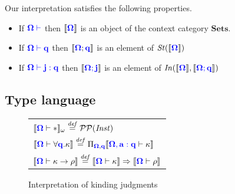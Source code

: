 \documentclass[sigplan,10pt,review,anonymous]{acmart}
\newcommand{\blum}[1]{\mathbf{\color{blue}{#1}}}
\newcommand{\defeq}{\overset{\mathit{def}}{=}}
\newcommand{\sem}[1]{\llbracket #1 \rrbracket}
\begin{document}
\begin{theorem} Our interpretation satisfies the following properties.
\begin{itemize}
\item If $\blum{\Omega \vdash}$ then $\sem{\blum{\Omega}}$ is an object of the context category $\mathbf{Sets}$.
\item If $\blum{\Omega \vdash q}$ then $\sem{\blum{\Omega};\blum{q}}$ is an element of $\mathit{St}(\sem{\blum{\Omega}})$
\item If $\blum{\Omega \vdash j : q}$ then $\sem{\blum{\Omega ; j}}$ is an element of $\mathit{In}(\sem{\blum{\Omega}}, \sem{\blum{\Omega ; q}})$
\end{itemize}
\end{theorem}

\subsection{Type language}


\begin{figure}

\begin{small}
\begin{tabular}{l}
$\sem{\blum{\Omega} \vdash \ast}_\omega \defeq \mathcal P \mathcal P (\mathit{Inst})$\\
$\sem{\blum{\Omega} \vdash \forall \blum{q}. \kappa} \defeq \Pi_{\blum{\Omega},\blum{q}} \sem{\blum{\Omega, a : q} \vdash \kappa}$\\
$\sem{\blum{\Omega} \vdash \kappa \to \rho} \defeq \sem{\blum{\Omega} \vdash \kappa} \Rightarrow \sem{\blum{\Omega} \vdash \rho}$
\end{tabular}
\end{small}
\caption{Interpretation of kinding judgments}
\label{fig:kind-interp}
\end{figure}
\end{document}
